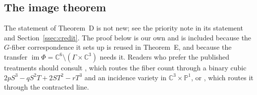 \documentclass[11pt]{amsart}
\newcommand{\CC}{\mathbb{C}}
\newcommand{\im}{\operatorname{im}}
\theoremstyle{plain}
\theoremstyle{definition}
\theoremstyle{remark}
\begin{document}
\subsection{The image theorem}\label{ssec:image}

The statement of Theorem~D is not new; see the priority note in its
statement and Section~\ref{ssec:credit}. The proof below is our own and is
included because the $G$-fiber correspondence it sets up is reused in
Theorem~E, and because the transfer $\im\Phi=\CC^{6}\setminus(\Gamma\times
\CC^{3})$ needs it. Readers who prefer the published treatments should
consult \cite[Thm.~4.2]{Ulam26}, which routes the fiber count through a
binary cubic $2pS^{3}-qS^{2}T+2ST^{2}-rT^{3}$ and an incidence variety in
$\CC^{3}\times\mathbb{P}^{1}$, or \cite[Prop.~5.1]{Shaska26}, which routes
it through the contracted line.
\end{document}
